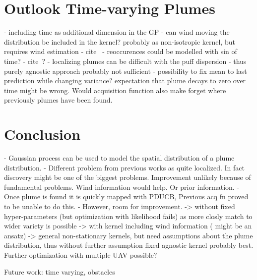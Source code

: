\documentclass[11pt,a4paper,twoside,BCOR=15mm]{scrbook}
\begin{document}
\tableofcontents


\printglossary[title={Symbols and Notation}]

\printglossary[type=\acronymtype]

\mainmatter{}







\chapter{Outlook Time-varying Plumes}\label{sec:timevarying}
- including time as additional dimension in the GP
- can wind moving the distribution be included in the kernel? probably as 
non-isotropic kernel, but requires wind estimation
- cite~\cite{Singh:2010wt}
- reoccurences could be modelled with sin of time?
- cite~\cite{Chatzis:hr}?
- localizing plumes can be difficult with the puff dispersion
- thus purely agnostic approach probably not sufficient
- possibility to fix mean to last prediction while changing variance?  
expectation that plume decays to zero over time might be wrong. Would 
acquisition function also make forget where previously plumes have been found.

\chapter{Conclusion}
- Gaussian process can be used to model the spatial distribution of a plume 
distribution.
- Different problem from previous works as quite localized. In fact discovery 
might be one of the biggest problems. Improvement unlikely because of 
fundamental problems. Wind information would help. Or prior information.
- Once plume is found it is quickly mapped with PDUCB, Previous acq fn proved to 
be unable to do this.
- However, room for improvement.
-> without fixed hyper-parameters (but optimization with likelihood fails) as 
more closly match to wider variety is possible
-> with kernel including wind information (\cite{Reggente:2009ti} might be an 
ansatz)
-> general non-stationary kernels, but need assumptions about the plume 
distribution, thus without further assumption fixed agnostic kernel probably 
best.
Further optimization with multiple UAV possible?

Future work: time varying, obstacles

\appendix


\backmatter{}
\listoffigures{}
\printbibliography{}
\end{document}
